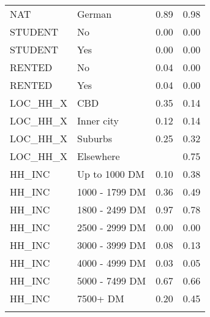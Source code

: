 \begin{longtable}{llrr}
  NAT & German & 0.89 & 0.98 \\ 
  STUDENT & No & 0.00 & 0.00 \\ 
  STUDENT & Yes & 0.00 & 0.00 \\ 
  RENTED & No & 0.04 & 0.00 \\ 
  RENTED & Yes & 0.04 & 0.00 \\ 
  LOC\_HH\_X & CBD & 0.35 & 0.14 \\ 
  LOC\_HH\_X & Inner city & 0.12 & 0.14 \\ 
  LOC\_HH\_X & Suburbs & 0.25 & 0.32 \\ 
  LOC\_HH\_X & Elsewhere &  & 0.75 \\ 
  HH\_INC & Up to 1000 DM & 0.10 & 0.38 \\ 
  HH\_INC & 1000 - 1799 DM & 0.36 & 0.49 \\ 
  HH\_INC & 1800 - 2499 DM & 0.97 & 0.78 \\ 
  HH\_INC & 2500 - 2999 DM & 0.00 & 0.00 \\ 
  HH\_INC & 3000 - 3999 DM & 0.08 & 0.13 \\ 
  HH\_INC & 4000 - 4999 DM & 0.03 & 0.05 \\ 
  HH\_INC & 5000 - 7499 DM & 0.67 & 0.66 \\ 
  HH\_INC & 7500+ DM & 0.20 & 0.45 \\ 
\hline
\label{tab:tests.AGE}
\end{longtable}
